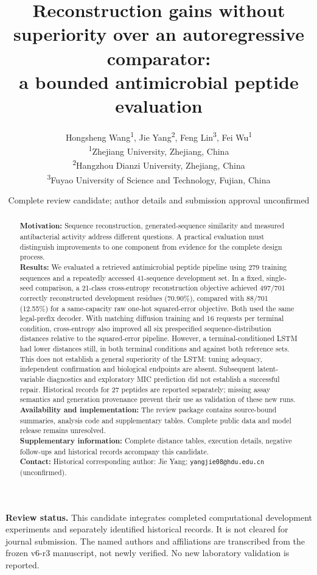 \documentclass[12pt,a4paper]{article}
\title{Reconstruction gains without superiority over an autoregressive comparator:\\a bounded antimicrobial peptide evaluation}
\author{Hongsheng Wang\textsuperscript{1}, Jie Yang\textsuperscript{2}, Feng Lin\textsuperscript{3}, Fei Wu\textsuperscript{1}\\[3pt]
\small \textsuperscript{1}Zhejiang University, Zhejiang, China\\
\small \textsuperscript{2}Hangzhou Dianzi University, Zhejiang, China\\
\small \textsuperscript{3}Fuyao University of Science and Technology, Fujian, China}
\date{Complete review candidate; author details and submission approval unconfirmed}
\begin{document}
\linenumbers
\maketitle
\noindent\textbf{Review status.} This candidate integrates completed computational development experiments and separately identified historical records. It is not cleared for journal submission. The named authors and affiliations are transcribed from the frozen v6-r3 manuscript, not newly verified. No new laboratory validation is reported.

\begin{abstract}
\noindent\textbf{Motivation:} Sequence reconstruction, generated-sequence similarity and measured antibacterial activity address different questions. A practical evaluation must distinguish improvements to one component from evidence for the complete design process.\\
\textbf{Results:} We evaluated a retrieved antimicrobial peptide pipeline using 279 training sequences and a repeatedly accessed 41-sequence development set. In a fixed, single-seed comparison, a 21-class cross-entropy reconstruction objective achieved 497/701 correctly reconstructed development residues (70.90\%), compared with 88/701 (12.55\%) for a same-capacity raw one-hot squared-error objective. Both used the same legal-prefix decoder. With matching diffusion training and 16 requests per terminal condition, cross-entropy also improved all six prespecified sequence-distribution distances relative to the squared-error pipeline. However, a terminal-conditioned LSTM had lower distances still, in both terminal conditions and against both reference sets. This does not establish a general superiority of the LSTM: tuning adequacy, independent confirmation and biological endpoints are absent. Subsequent latent-variable diagnostics and exploratory MIC prediction did not establish a successful repair. Historical records for 27 peptides are reported separately; missing assay semantics and generation provenance prevent their use as validation of these new runs.\\
\textbf{Availability and implementation:} The review package contains source-bound summaries, analysis code and supplementary tables. Complete public data and model release remains unresolved.\\
\textbf{Supplementary information:} Complete distance tables, execution details, negative follow-ups and historical records accompany this candidate.\\
\textbf{Contact:} Historical corresponding author: Jie Yang; \texttt{yangjie08@hdu.edu.cn} (unconfirmed).
\end{abstract}
\end{document}
